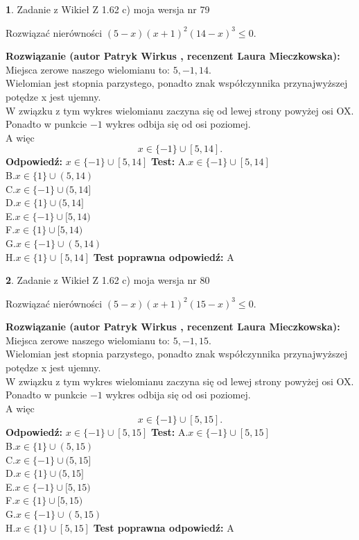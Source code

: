 \documentclass[12pt, a4paper]{article}
\theoremstyle{definition} %
\newtheorem{zad}{}
\newcommand{\zadStart}[1]{\begin{zad}#1\newline}
\newcommand{\zadStop}{\end{zad}}
\newcommand{\rozwStart}[2]{\noindent \textbf{Rozwiązanie (autor #1 , recenzent #2): }\newline}
\newcommand{\rozwStop}{\newline}
\newcommand{\odpStart}{\noindent \textbf{Odpowiedź:}\newline}
\newcommand{\odpStop}{\newline}
\newcommand{\testStart}{\noindent \textbf{Test:}\newline}
\newcommand{\testStop}{\newline}
\newcommand{\kluczStart}{\noindent \textbf{Test poprawna odpowiedź:}\newline}
\newcommand{\kluczStop}{\newline}
\begin{document}
\zadStart{Zadanie z Wikieł Z 1.62 c) moja wersja nr 79}

Rozwiązać nierówności $(5-x)(x+1)^{2}(14-x)^{3}\le0$.
\zadStop
\rozwStart{Patryk Wirkus}{Laura Mieczkowska}
Miejsca zerowe naszego wielomianu to: $5, -1, 14$.\\
Wielomian jest stopnia parzystego, ponadto znak współczynnika przy\linebreak najwyższej potędze x jest ujemny.\\ W związku z tym wykres wielomianu zaczyna się od lewej strony powyżej osi OX.\\
Ponadto w punkcie $-1$ wykres odbija się od osi poziomej.\\
A więc $$x \in \{-1\} \cup [5,14].$$
\rozwStop
\odpStart
$x \in \{-1\} \cup [5,14]$
\odpStop
\testStart
A.$x \in \{-1\} \cup [5,14]$\\
B.$x \in \{1\} \cup (5,14)$\\
C.$x \in \{-1\} \cup (5,14]$\\
D.$x \in \{1\} \cup (5,14]$\\
E.$x \in \{-1\} \cup [5,14)$\\
F.$x \in \{1\} \cup [5,14)$\\
G.$x \in \{-1\} \cup (5,14)$\\
H.$x \in \{1\} \cup [5,14]$
\testStop
\kluczStart
A
\kluczStop



\zadStart{Zadanie z Wikieł Z 1.62 c) moja wersja nr 80}

Rozwiązać nierówności $(5-x)(x+1)^{2}(15-x)^{3}\le0$.
\zadStop
\rozwStart{Patryk Wirkus}{Laura Mieczkowska}
Miejsca zerowe naszego wielomianu to: $5, -1, 15$.\\
Wielomian jest stopnia parzystego, ponadto znak współczynnika przy\linebreak najwyższej potędze x jest ujemny.\\ W związku z tym wykres wielomianu zaczyna się od lewej strony powyżej osi OX.\\
Ponadto w punkcie $-1$ wykres odbija się od osi poziomej.\\
A więc $$x \in \{-1\} \cup [5,15].$$
\rozwStop
\odpStart
$x \in \{-1\} \cup [5,15]$
\odpStop
\testStart
A.$x \in \{-1\} \cup [5,15]$\\
B.$x \in \{1\} \cup (5,15)$\\
C.$x \in \{-1\} \cup (5,15]$\\
D.$x \in \{1\} \cup (5,15]$\\
E.$x \in \{-1\} \cup [5,15)$\\
F.$x \in \{1\} \cup [5,15)$\\
G.$x \in \{-1\} \cup (5,15)$\\
H.$x \in \{1\} \cup [5,15]$
\testStop
\kluczStart
A
\kluczStop
\end{document}
